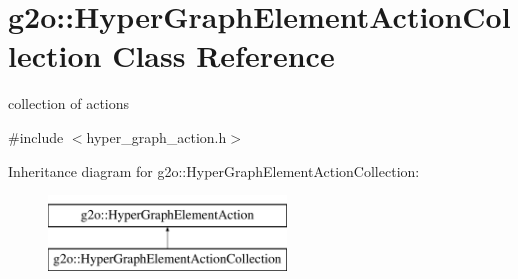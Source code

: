 \hypertarget{classg2o_1_1_hyper_graph_element_action_collection}{}\section{g2o\+:\+:Hyper\+Graph\+Element\+Action\+Collection Class Reference}
\label{classg2o_1_1_hyper_graph_element_action_collection}


collection of actions  




{\ttfamily \#include $<$hyper\+\_\+graph\+\_\+action.\+h$>$}

Inheritance diagram for g2o\+:\+:Hyper\+Graph\+Element\+Action\+Collection\+:\begin{figure}[H]
\begin{center}
\leavevmode
\includegraphics[height=2.000000cm]{classg2o_1_1_hyper_graph_element_action_collection}
\end{center}
\end{figure}

